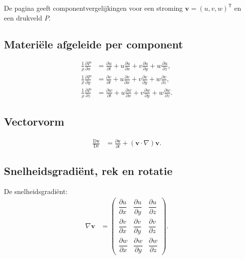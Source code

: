 \documentclass[11pt]{article}
\newcommand{\D}{\mathrm{D}}
\newcommand{\vect}[1]{\mathbf{#1}}
\begin{document}
De pagina geeft componentvergelijkingen voor een stroming $\vect{v}=\left(u,v,w\right)^{\mathsf{T}}$ en een drukveld $P$.

\subsection*{Materiële afgeleide per component}

\begin{align*}
\frac{1}{\rho}\frac{\partial P}{\partial x}
  &=
  \frac{\partial u}{\partial t}
  +u\frac{\partial u}{\partial x}
  +v\frac{\partial u}{\partial y}
  +w\frac{\partial u}{\partial z},
\\
\frac{1}{\rho}\frac{\partial P}{\partial y}
  &=
  \frac{\partial v}{\partial t}
  +u\frac{\partial v}{\partial x}
  +v\frac{\partial v}{\partial y}
  +w\frac{\partial v}{\partial z},
\\
\frac{1}{\rho}\frac{\partial P}{\partial z}
  &=
  \frac{\partial w}{\partial t}
  +u\frac{\partial w}{\partial x}
  +v\frac{\partial w}{\partial y}
  +w\frac{\partial w}{\partial z}.
\end{align*}

\subsection*{Vectorvorm}

\begin{align*}
\frac{\D\vect{v}}{\D t}
  &=
  \frac{\partial\vect{v}}{\partial t}
  +
  \left(\vect{v}\cdot\nabla\right)\vect{v}.
\end{align*}

\subsection*{Snelheidsgradiënt, rek en rotatie}

De snelheidsgradiënt:
\begin{align*}
\nabla\vect{v}
  &=
  \begin{pmatrix}
  \dfrac{\partial u}{\partial x}
    & \dfrac{\partial u}{\partial y}
    & \dfrac{\partial u}{\partial z}\\[0.9em]
  \dfrac{\partial v}{\partial x}
    & \dfrac{\partial v}{\partial y}
    & \dfrac{\partial v}{\partial z}\\[0.9em]
  \dfrac{\partial w}{\partial x}
    & \dfrac{\partial w}{\partial y}
    & \dfrac{\partial w}{\partial z}
  \end{pmatrix}.
\end{align*}
\end{document}
